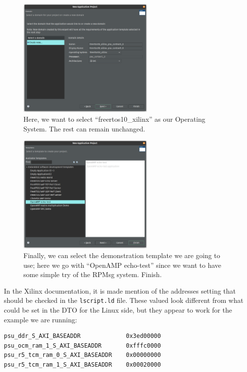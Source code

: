 \documentclass[10pt]{article}
\begin{document}
\begin{figure}[H]
  \centering
  \includegraphics[width=0.6\textwidth]{./img/vitis_new/project6}
  \caption{Here, we want to select ``freertos10\_xilinx'' as our Operating System. The rest can remain unchanged.}
\end{figure}

\begin{figure}[H]
  \centering
  \includegraphics[width=0.6\textwidth]{./img/vitis_new/project7}
  \caption{Finally, we can select the demonstration template we are going to use; here we go with ``OpenAMP echo-test'' since we want to
    have some simple try of the RPMsg system. Finish.}
\end{figure}


In the Xilinx documentation, it is made mention of the addresses setting that should be checked in the \verb|lscript.ld| file.
These valued look different from what could be set in the DTO for the Linux side, but they appear to
work for the example we are running:
\begin{tcolorbox}
\begin{verbatim}
psu_ddr_S_AXI_BASEADDR             0x3ed00000
psu_ocm_ram_1_S_AXI_BASEADDR       0xfffc0000
psu_r5_tcm_ram_0_S_AXI_BASEADDR    0x00000000
psu_r5_tcm_ram_1_S_AXI_BASEADDR    0x00020000
\end{verbatim}
\end{tcolorbox}
\end{document}
